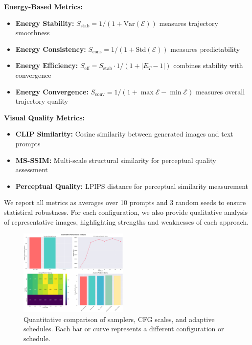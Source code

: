 \documentclass[10pt,twocolumn]{article}
\begin{document}
\textbf{Energy-Based Metrics:}
\begin{itemize}[noitemsep]
    \item \textbf{Energy Stability:} $S_{\text{stab}} = 1/(1+\text{Var}(\mathcal{E}))$ measures trajectory smoothness
    \item \textbf{Energy Consistency:} $S_{\text{cons}} = 1/(1+\text{Std}(\mathcal{E}))$ measures predictability
    \item \textbf{Energy Efficiency:} $S_{\text{eff}} = S_{\text{stab}} \cdot 1/(1+|E_T-1|)$ combines stability with convergence
    \item \textbf{Energy Convergence:} $S_{\text{conv}} = 1/(1+\max \mathcal{E} - \min \mathcal{E})$ measures overall trajectory quality
\end{itemize}

\textbf{Visual Quality Metrics:}
\begin{itemize}[noitemsep]
    \item \textbf{CLIP Similarity:} Cosine similarity between generated images and text prompts
    \item \textbf{MS-SSIM:} Multi-scale structural similarity for perceptual quality assessment
    \item \textbf{Perceptual Quality:} LPIPS distance for perceptual similarity measurement
\end{itemize}

We report all metrics as averages over 10 prompts and 3 random seeds to ensure statistical robustness. For each configuration, we also provide qualitative analysis of representative images, highlighting strengths and weaknesses of each approach.

\begin{figure}[H]
    \centering
    \includegraphics[width=0.48\textwidth]{figures/quantitative_analysis.png}
    \caption{Quantitative comparison of samplers, CFG scales, and adaptive schedules. Each bar or curve represents a different configuration or schedule.}
    \label{fig:quantitative}
\end{figure}
\end{document}
